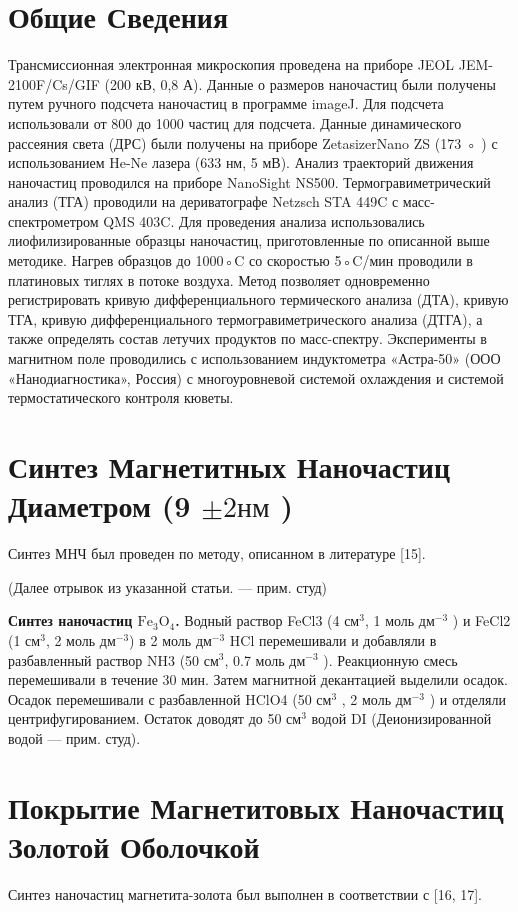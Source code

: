 \documentclass[10pt, a4paper]{article}
\begin{document}
\section*{Общие Сведения}
Трансмиссионная электронная микроскопия проведена на приборе JEOL JEM-2100F/Cs/GIF (200 кВ, 0,8 А). Данные о
размеров наночастиц были получены путем ручного подсчета наночастиц в программе imageJ. Для подсчета использовали от 800 до 1000 частиц
для подсчета. Данные динамического рассеяния света (ДРС) были получены на приборе ZetasizerNano ZS (173 ◦ ) с использованием He-Ne
лазера (633 нм, 5 мВ). Анализ траекторий движения наночастиц проводился на приборе NanoSight NS500. Термогравиметрический
анализ (ТГА) проводили на дериватографе Netzsch STA 449C с масс-спектрометром QMS 403C. Для проведения
анализа использовались лиофилизированные образцы наночастиц, приготовленные по описанной выше методике. Нагрев образцов
до 1000◦C со скоростью 5◦C/мин проводили в платиновых тиглях в потоке воздуха. Метод позволяет одновременно регистрировать
кривую дифференциального термического анализа (ДТА), кривую ТГА, кривую дифференциального термогравиметрического анализа (ДТГА), а также
определять состав летучих продуктов по масс-спектру. Эксперименты в магнитном поле проводились
с использованием индуктометра «Астра-50» (ООО «Нанодиагностика», Россия) с многоуровневой системой охлаждения и системой
термостатического контроля кюветы.

\section*{Синтез Магнетитных Наночастиц Диаметром (9 \(\pm 2 \text{нм}\) )}
Синтез МНЧ был проведен по методу, описанном в литературе [15].

(Далее отрывок из указанной статьи. --- прим. студ)

\textbf{Синтез наночастиц $\text{Fe}_3\text{O}_4$.}  Водный раствор FeCl3 (4 $\text{см}^3$, 1 моль $\text{дм}^{-3}$ ) и FeCl2 (1 $\text{см}^3$, 2 моль $\text{дм}^{-3}$) в 2 моль $\text{дм}^{-3}$ HCl перемешивали и добавляли в разбавленный раствор NH3 (50 $\text{см}^3$, 0.7 моль $\text{дм}^{-3}$ ). Реакционную смесь перемешивали в течение 30 мин. Затем магнитной декантацией выделили осадок. Осадок перемешивали с разбавленной HClO4 (50 $\text{см}^3$ , 2 моль $\text{дм}^{-3}$ ) и отделяли центрифугированием. Остаток доводят до 50 $\text{см}^3$ водой DI (Деионизированной водой --- прим. студ). 

\section*{Покрытие Магнетитовых Наночастиц Золотой Оболочкой}
Синтез наночастиц магнетита-золота был выполнен в соответствии с [16, 17].
\end{document}

